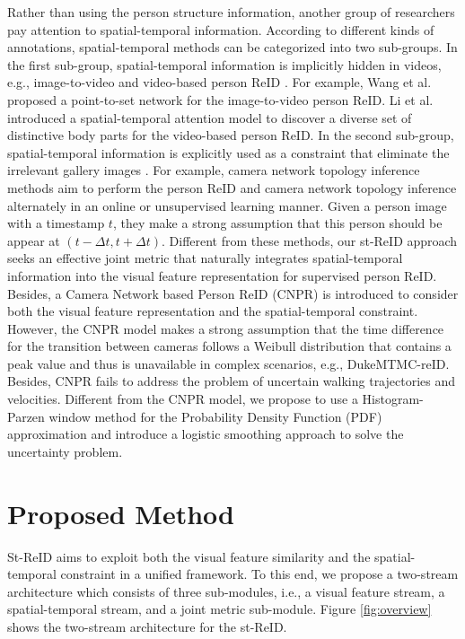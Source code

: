 \documentclass[letterpaper]{article} %
\begin{document}
Rather than using the person structure information, another group of researchers pay attention to spatial-temporal information. According to different kinds of annotations, spatial-temporal methods can be categorized into two sub-groups. In the first sub-group, spatial-temporal information is implicitly hidden in videos, e.g., image-to-video \cite{wang2017tcsvt} and video-based person ReID \cite{Li_2018_CVPR,zheng2016mars}. For example, Wang et al. \cite{wang2017tcsvt} proposed a point-to-set network for the image-to-video person ReID. Li et al. \cite{Li_2018_CVPR} introduced a spatial-temporal attention model to discover a diverse set of distinctive body parts for the video-based person ReID. In the second sub-group, spatial-temporal information is explicitly used as a constraint that eliminate the irrelevant gallery images \cite{yeong,huang2016mmm,Lv_2018_CVPR}. For example, camera network topology inference methods \cite{yeong,Lv_2018_CVPR} aim to perform the person ReID and camera network topology inference alternately in an online or unsupervised learning manner. Given a person image with a timestamp $t$, they make a strong assumption that this person should be appear at $(t-\Delta t,t+\Delta t)$. Different from these methods, our st-ReID approach seeks an effective joint metric that naturally integrates spatial-temporal information into the visual feature representation for supervised person ReID. Besides, a Camera Network based Person ReID (CNPR) \cite{huang2016mmm} is introduced to consider both the visual feature representation and the spatial-temporal constraint. However, the CNPR model makes a strong assumption that the time difference for the transition between cameras follows a Weibull distribution that contains a peak value and thus is unavailable in complex scenarios, e.g., DukeMTMC-reID. Besides, CNPR fails to address the problem of uncertain walking trajectories and velocities. Different from the CNPR model, we propose to use a Histogram-Parzen window method for the Probability Density Function (PDF) approximation and introduce a logistic smoothing approach to solve the uncertainty problem.

\section{Proposed Method}
\label{sec:met}
St-ReID aims to exploit both the visual feature similarity and the spatial-temporal constraint in a unified framework. To this end, we propose a two-stream architecture which consists of three sub-modules, i.e., a visual feature stream, a spatial-temporal stream, and a joint metric sub-module. Figure \ref{fig:overview} shows the two-stream architecture for the st-ReID.
\end{document}
